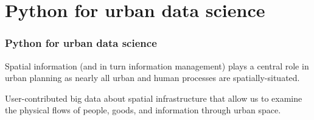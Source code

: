 \documentclass{beamer}
\begin{document}
\section{Python for urban data science}

\begin{frame}
\frametitle{Python for urban data science}

Spatial information (and in turn information management) plays a central role in urban planning as nearly all urban and human processes are spatially-situated. \pause


User-contributed big data about spatial infrastructure that allow us to examine the physical flows of people, goods, and information through urban space.

\end{frame}
\end{document}
